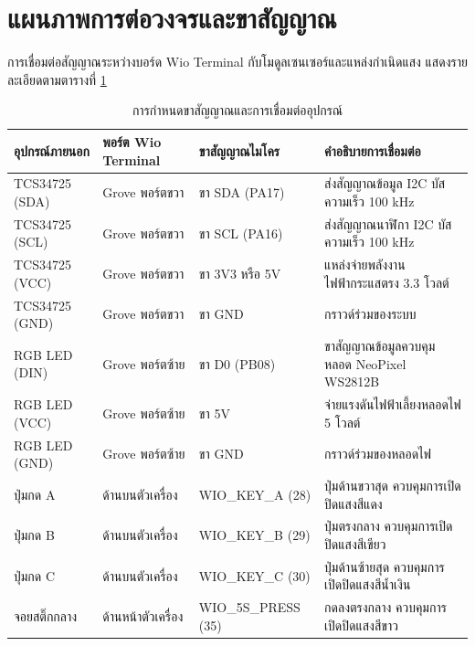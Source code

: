 \section{แผนภาพการต่อวงจรและขาสัญญาณ}
การเชื่อมต่อสัญญาณระหว่างบอร์ด Wio Terminal กับโมดูลเซนเซอร์และแหล่งกำเนิดแสง แสดงรายละเอียดตามตารางที่ \ref{tab:pinout}

\begin{table}[H]
    \caption{การกำหนดขาสัญญาณและการเชื่อมต่ออุปกรณ์}
    \label{tab:pinout}
    \begin{tabularx}{\textwidth}{p{3.0cm}p{3.0cm}p{3.0cm}X}
        \toprule
        \textbf{อุปกรณ์ภายนอก} & \textbf{พอร์ต Wio Terminal} & \textbf{ขาสัญญาณไมโคร} & \textbf{คำอธิบายการเชื่อมต่อ} \\
        \midrule
        TCS34725 (SDA) & Grove พอร์ตขวา & ขา SDA (PA17) & ส่งสัญญาณข้อมูล I2C บัสความเร็ว 100 kHz \\
        TCS34725 (SCL) & Grove พอร์ตขวา & ขา SCL (PA16) & ส่งสัญญาณนาฬิกา I2C บัสความเร็ว 100 kHz \\
        TCS34725 (VCC) & Grove พอร์ตขวา & ขา 3V3 หรือ 5V & แหล่งจ่ายพลังงานไฟฟ้ากระแสตรง 3.3 โวลต์ \\
        TCS34725 (GND) & Grove พอร์ตขวา & ขา GND & กราวด์ร่วมของระบบ \\
        \midrule
        RGB LED (DIN)  & Grove พอร์ตซ้าย & ขา D0 (PB08) & ขาสัญญาณข้อมูลควบคุมหลอด NeoPixel WS2812B \\
        RGB LED (VCC)  & Grove พอร์ตซ้าย & ขา 5V        & จ่ายแรงดันไฟฟ้าเลี้ยงหลอดไฟ 5 โวลต์ \\
        RGB LED (GND)  & Grove พอร์ตซ้าย & ขา GND       & กราวด์ร่วมของหลอดไฟ \\
        \midrule
        ปุ่มกด A       & ด้านบนตัวเครื่อง & WIO\_KEY\_A (28) & ปุ่มด้านขวาสุด ควบคุมการเปิดปิดแสงสีแดง \\
        ปุ่มกด B       & ด้านบนตัวเครื่อง & WIO\_KEY\_B (29) & ปุ่มตรงกลาง ควบคุมการเปิดปิดแสงสีเขียว \\
        ปุ่มกด C       & ด้านบนตัวเครื่อง & WIO\_KEY\_C (30) & ปุ่มด้านซ้ายสุด ควบคุมการเปิดปิดแสงสีน้ำเงิน \\
        จอยสติ๊กกลาง   & ด้านหน้าตัวเครื่อง & WIO\_5S\_PRESS (35) & กดลงตรงกลาง ควบคุมการเปิดปิดแสงสีขาว \\
        \bottomrule
    \end{tabularx}
\end{table}

